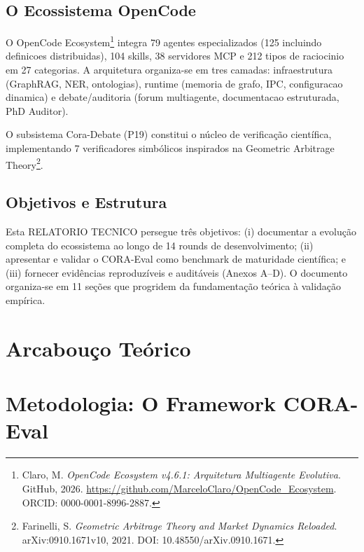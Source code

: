\documentclass[12pt,a4paper,oneside]{article}
\begin{document}
\subsection{O Ecossistema OpenCode}

O OpenCode Ecosystem\footnote{Claro, M. \textit{OpenCode Ecosystem v4.6.1:
Arquitetura Multiagente Evolutiva}. GitHub, 2026.
\url{https://github.com/MarceloClaro/OpenCode\_Ecosystem}.
ORCID: 0000-0001-8996-2887.} integra 79 agentes especializados (125 incluindo
definicoes distribuidas), 104 skills,
38 servidores MCP e 212 tipos de raciocinio em 27 categorias. A arquitetura
organiza-se em tres camadas: infraestrutura (GraphRAG, NER, ontologias),
runtime (memoria de grafo, IPC, configuracao dinamica) e debate/auditoria
(forum multiagente, documentacao estruturada, PhD Auditor).

O subsistema Cora-Debate (P19) constitui o núcleo de verificação científica,
implementando 7 verificadores simbólicos inspirados na Geometric Arbitrage
Theory\footnote{Farinelli, S. \textit{Geometric Arbitrage Theory and Market
Dynamics Reloaded}. arXiv:0910.1671v10, 2021. DOI:
10.48550/arXiv.0910.1671.}.

\subsection{Objetivos e Estrutura}

Esta RELATORIO TECNICO persegue três objetivos: (i) documentar a evolução completa
do ecossistema ao longo de 14 rounds de desenvolvimento; (ii) apresentar e
validar o CORA-Eval como benchmark de maturidade científica; e (iii) fornecer
evidências reproduzíveis e auditáveis (Anexos A--D). O documento organiza-se
em 11 seções que progridem da fundamentação teórica à validação empírica.

\section{Arcabouço Teórico}




\section{Metodologia: O Framework CORA-Eval}
\end{document}
